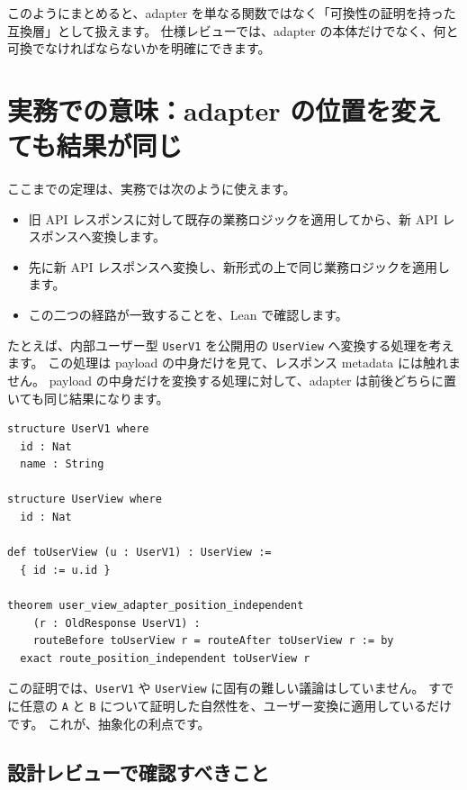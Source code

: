このようにまとめると、adapter を単なる関数ではなく「可換性の証明を持った互換層」として扱えます。
仕様レビューでは、adapter の本体だけでなく、何と可換でなければならないかを明確にできます。

\section{実務での意味：adapter の位置を変えても結果が同じ}

ここまでの定理は、実務では次のように使えます。

\begin{itemize}
\item 旧 API レスポンスに対して既存の業務ロジックを適用してから、新 API レスポンスへ変換します。
\item 先に新 API レスポンスへ変換し、新形式の上で同じ業務ロジックを適用します。
\item この二つの経路が一致することを、Lean で確認します。
\end{itemize}

たとえば、内部ユーザー型 \texttt{UserV1} を公開用の \texttt{UserView} へ変換する処理を考えます。
この処理は payload の中身だけを見て、レスポンス metadata には触れません。
payload の中身だけを変換する処理に対して、adapter は前後どちらに置いても同じ結果になります。

\begin{listing}[htbp]
\begin{verbatim}
structure UserV1 where
  id : Nat
  name : String

structure UserView where
  id : Nat

def toUserView (u : UserV1) : UserView :=
  { id := u.id }

theorem user_view_adapter_position_independent
    (r : OldResponse UserV1) :
    routeBefore toUserView r = routeAfter toUserView r := by
  exact route_position_independent toUserView r
\end{verbatim}
\caption{\texttt{user\_view\_adapter\_position\_independent}}
\label{lst:ch31-user-view}
\end{listing}

この証明では、\texttt{UserV1} や \texttt{UserView} に固有の難しい議論はしていません。
すでに任意の \texttt{A} と \texttt{B} について証明した自然性を、ユーザー変換に適用しているだけです。
これが、抽象化の利点です。

\subsection{設計レビューで確認すべきこと}


